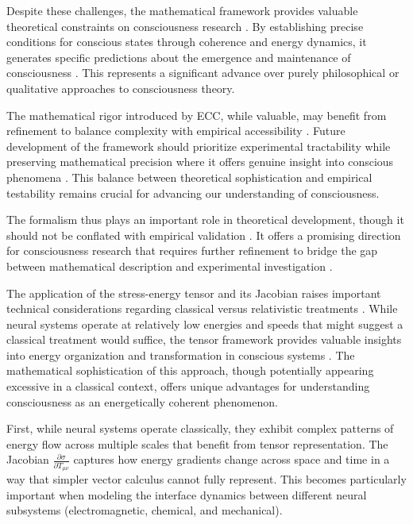 Despite these challenges, the mathematical framework provides valuable theoretical constraints on consciousness research \cite{koch2019feeling, thompson2014waking}. By establishing precise conditions for conscious states through coherence and energy dynamics, it generates specific predictions about the emergence and maintenance of consciousness \cite{varela2016embodied}. This represents a significant advance over purely philosophical or qualitative approaches to consciousness theory.

The mathematical rigor introduced by ECC, while valuable, may benefit from refinement to balance complexity with empirical accessibility \cite{chalmers2010character}. Future development of the framework should prioritize experimental tractability while preserving mathematical precision where it offers genuine insight into conscious phenomena \cite{seth2021being}. This balance between theoretical sophistication and empirical testability remains crucial for advancing our understanding of consciousness.

The formalism thus plays an important role in theoretical development, though it should not be conflated with empirical validation \cite{goff2019galileo}. It offers a promising direction for consciousness research that requires further refinement to bridge the gap between mathematical description and experimental investigation \cite{feinberg2016ancient}.

The application of the stress-energy tensor and its Jacobian raises important technical considerations regarding classical versus relativistic treatments \cite{rosen2012anticipatory}. While neural systems operate at relatively low energies and speeds that might suggest a classical treatment would suffice, the tensor framework provides valuable insights into energy organization and transformation in conscious systems \cite{rovelli2018order}. The mathematical sophistication of this approach, though potentially appearing excessive in a classical context, offers unique advantages for understanding consciousness as an energetically coherent phenomenon.

First, while neural systems operate classically, they exhibit complex patterns of energy flow across multiple scales that benefit from tensor representation. The Jacobian $\frac{\partial \sigma}{\partial T_{\mu\nu}}$ captures how energy gradients change across space and time in a way that simpler vector calculus cannot fully represent. This becomes particularly important when modeling the interface dynamics between different neural subsystems (electromagnetic, chemical, and mechanical).


